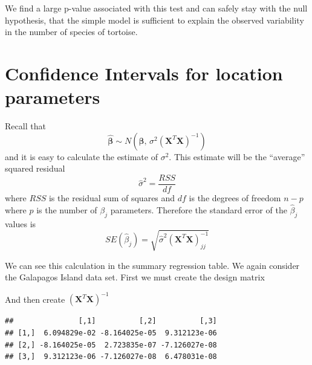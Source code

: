 \documentclass[]{book}
\newenvironment{Shaded}{\begin{snugshade}}{\end{snugshade}}
\newcommand{\KeywordTok}[1]{\textcolor[rgb]{0.13,0.29,0.53}{\textbf{{#1}}}}
\newcommand{\DecValTok}[1]{\textcolor[rgb]{0.00,0.00,0.81}{{#1}}}
\newcommand{\StringTok}[1]{\textcolor[rgb]{0.31,0.60,0.02}{{#1}}}
\newcommand{\NormalTok}[1]{{#1}}
\theoremstyle{definition}
\theoremstyle{definition}
\theoremstyle{remark}
\begin{document}
We find a large p-value associated with this test and can safely stay
with the null hypothesis, that the simple model is sufficient to explain
the observed variability in the number of species of tortoise.

\section{Confidence Intervals for location
parameters}\label{confidence-intervals-for-location-parameters}

Recall that
\[\hat{\boldsymbol{\beta}}\sim N\left(\boldsymbol{\beta},\,\sigma^{2}\left(\mathbf{X}^{T}\mathbf{X}\right)^{-1}\right)\]
and it is easy to calculate the estimate of \(\sigma^{2}\). This
estimate will be the ``average'' squared residual
\[\hat{\sigma}^{2}=\frac{RSS}{df}\] where \(RSS\) is the residual sum of
squares and \(df\) is the degrees of freedom \(n-p\) where \(p\) is the
number of \(\beta_{j}\) parameters. Therefore the standard error of the
\(\hat{\beta}_{j}\) values is
\[SE\left(\hat{\beta}_{j}\right)=\sqrt{\hat{\sigma}^{2}\left(\mathbf{X}^{T}\mathbf{X}\right)_{jj}^{-1}}\]

We can see this calculation in the summary regression table. We again
consider the Galapagos Island data set. First we must create the design
matrix

\begin{Shaded}
\end{Shaded}

And then create \(\left(\mathbf{X}^{T}\mathbf{X}\right)^{-1}\)

\begin{Shaded}
\end{Shaded}

\begin{verbatim}
##               [,1]          [,2]          [,3]
## [1,]  6.094829e-02 -8.164025e-05  9.312123e-06
## [2,] -8.164025e-05  2.723835e-07 -7.126027e-08
## [3,]  9.312123e-06 -7.126027e-08  6.478031e-08
\end{verbatim}
\end{document}
